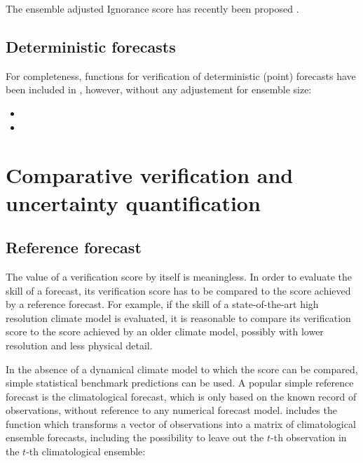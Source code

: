 \documentclass[article]{jss}
\begin{document}
The ensemble adjusted Ignorance score has recently been proposed \citep{siegert2015ignorance}.



\subsection{Deterministic forecasts}


For completeness, functions for verification of deterministic (point) forecasts have been included in , however, without any adjustement for ensemble size:
\begin{itemize}
\item {}
\item {}
\end{itemize}




\section{Comparative verification and uncertainty quantification}


\subsection{Reference forecast}

The value of a verification score by itself is meaningless.
In order to evaluate the skill of a forecast, its verification score has to be compared to the score achieved by a reference forecast.
For example, if the skill of a state-of-the-art high resolution climate model is evaluated, it is reasonable to compare its verification score to the score achieved by an older climate model, possibly with lower resolution and less physical detail.

In the absence of a dynamical climate model to which the score can be compared, simple statistical benchmark predictions can be used.
A popular simple reference forecast is the climatological forecast, which is only based on the known record of observations, without reference to any numerical forecast model.
 includes the function  which transforms a vector of observations into a matrix of climatological ensemble forecasts, including the possibility to leave out the $t$-th observation in the $t$-th climatological ensemble:

\begin{Schunk}
\end{Schunk}
\end{document}
